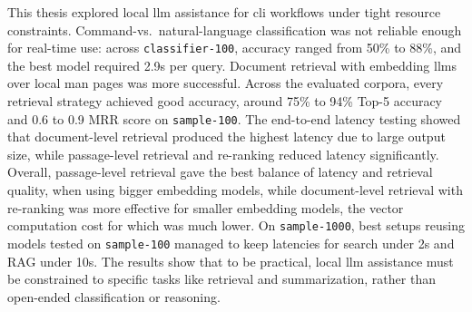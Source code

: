 This thesis explored local \gls{llm} assistance for \gls{cli} workflows under
tight resource constraints.
Command-vs.\ natural-language classification was not
reliable enough for real-time use: across \texttt{classifier-100}, accuracy
ranged from 50\% to 88\%, and the best model required 2.9s per query.
Document retrieval with embedding \glspl{llm} over local man pages was more
successful. Across the evaluated corpora, every retrieval strategy achieved good
accuracy, around 75\% to 94\% Top-5 accuracy and 0.6 to 0.9 MRR score on
\texttt{sample-100}. The end-to-end latency testing showed that document-level
retrieval produced the highest latency due to large output size, while
passage-level retrieval and re-ranking reduced latency significantly. Overall,
passage-level retrieval gave the best balance of latency and retrieval quality,
when using bigger embedding models, while document-level retrieval with
re-ranking was more effective for smaller embedding models, the vector
computation cost for which was much lower. On \texttt{sample-1000}, best setups
reusing models tested on \texttt{sample-100} managed to keep latencies for
search under 2s and RAG under 10s.
The results show that to be practical, local \gls{llm} assistance must be
constrained to specific tasks like retrieval and summarization, rather than
open-ended classification or reasoning.
